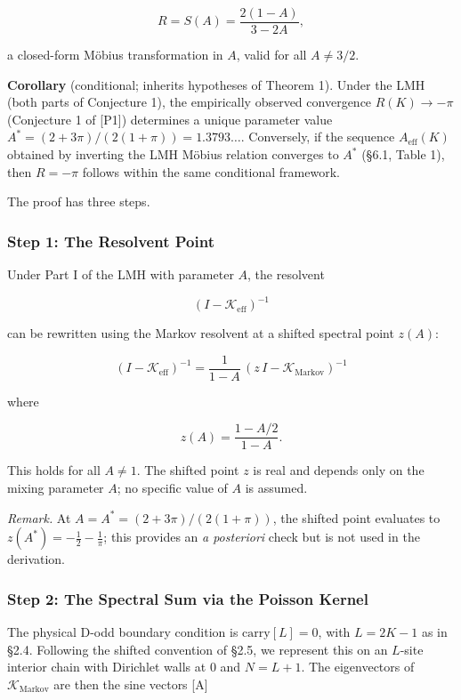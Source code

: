 \documentclass[
  11pt,
]{article}
\begin{document}
\[R = S(A) = \frac{2(1-A)}{3 - 2A},\]

a closed-form Möbius transformation in \(A\), valid for all \(A \neq 3/2\).

\textbf{Corollary} (conditional; inherits hypotheses of Theorem 1). Under the
LMH (both parts of Conjecture 1), the empirically observed convergence
\(R(K) \to -\pi\) (Conjecture 1 of {[}P1{]}) determines a unique parameter value
\(A^{\ast} = (2 + 3\pi)/(2(1+\pi)) = 1.3793\ldots\). Conversely, if the sequence
\(A_{\mathrm{eff}}(K)\) obtained by inverting the LMH Möbius relation converges
to \(A^{\ast}\) (§6.1, Table 1), then \(R = -\pi\) follows within the same
conditional framework.

The proof has three steps.

\subsubsection{Step 1: The Resolvent Point}\label{step-1-the-resolvent-point}

Under Part I of the LMH with parameter \(A\), the resolvent

\[(I - \mathcal{K}_{\mathrm{eff}})^{-1}\]

can be rewritten using the Markov resolvent at a shifted spectral point
\(z(A)\):

\[(I - \mathcal{K}_{\mathrm{eff}})^{-1} = \frac{1}{1 - A}\,(z\,I - \mathcal{K}_{\mathrm{Markov}})^{-1}\]

where

\[z(A) = \frac{1 - A/2}{1 - A}.\]

This holds for all \(A \neq 1\). The shifted point \(z\) is real and depends
only on the mixing parameter \(A\); no specific value of \(A\) is assumed.

\emph{Remark.} At \(A = A^{\ast} = (2+3\pi)/(2(1+\pi))\), the shifted point
evaluates to \(z(A^{\ast}) = -\tfrac{1}{2} - \tfrac{1}{\pi}\); this provides an
\emph{a posteriori} check but is not used in the derivation.

\subsubsection{Step 2: The Spectral Sum via the Poisson
Kernel}\label{step-2-the-spectral-sum-via-the-poisson-kernel}

The physical D-odd boundary condition is \(\mathrm{carry}[L] = 0\), with
\(L = 2K - 1\) as in §2.4. Following the shifted convention of §2.5, we
represent this on an \(L\)-site interior chain with Dirichlet walls at \(0\) and
\(N = L+1\). The eigenvectors of \(\mathcal{K}_{\mathrm{Markov}}\) are then the
sine vectors {[}A{]}
\end{document}
